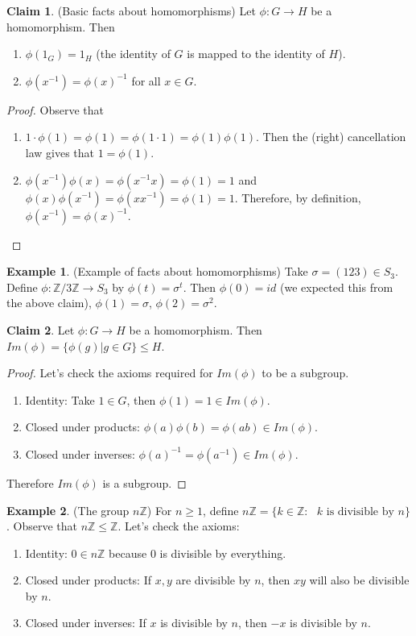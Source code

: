 \documentclass[12pt]{article}
\theoremstyle{definition}
\newtheorem{claim}{\color{JungleGreen}Claim}
\newtheorem{example}{\color{WildStrawberry}Example}
\theoremstyle{definition}
\begin{document}
\begin{claim}(Basic facts about homomorphisms)
Let $\phi : G \to H$ be a homomorphism. Then
\begin{enumerate}
	\item $\phi(1_G) = 1_H$ (the identity of $G$ is mapped to the identity of $H$).
	\item $\phi(x^{-1}) = \phi(x)^{-1}$ for all $x \in G$.
\end{enumerate}
\end{claim}
\begin{proof}
Observe that
\begin{enumerate}
	\item $1 \cdot \phi(1) = \phi(1) = \phi(1 \cdot 1) = \phi(1)\phi(1)$. Then the (right) cancellation law gives that $1 = \phi(1)$.
	\item $\phi(x^{-1})\phi(x) = \phi(x^{-1}x) = \phi(1) = 1$ and $\phi(x)\phi(x^{-1}) = \phi(xx^{-1}) = \phi(1) = 1$. Therefore, by definition, $\phi(x^{-1}) = \phi(x)^{-1}$.
\end{enumerate}
\end{proof}

\begin{example}(Example of facts about homomorphisms)
Take $\sigma = (1 2 3) \in S_3$. Define $\phi : \mathbb{Z} / 3 \mathbb{Z} \to S_3$ by $\phi(t) = \sigma^t$. Then $\phi(0) = id$ (we expected this from the above claim), $\phi(1) = \sigma$, $\phi(2) = \sigma^2$. 
\end{example}

\begin{claim}
Let $\phi : G \to H$ be a homomorphism. Then $Im(\phi) = \{ \phi(g) | g \in G \} \leq H$.
\end{claim}
\begin{proof}
Let's check the axioms required for $Im(\phi)$ to be a subgroup.
\begin{enumerate}
	\item Identity: Take $1 \in G$, then $\phi(1) = 1 \in Im(\phi)$.
	\item Closed under products: $\phi(a)\phi(b) = \phi(ab) \in Im(\phi)$.
	\item Closed under inverses: $\phi(a)^{-1} = \phi(a^{-1}) \in Im(\phi)$.
\end{enumerate}
Therefore $Im(\phi)$ is a subgroup.
\end{proof}

\begin{example}(The group $n \mathbb{Z}$)
For $n \geq 1$, define $n \mathbb{Z} = \{ k \in \mathbb{Z} : \text{ $k$ is divisible by $n$} \}$. Observe that $n \mathbb{Z} \leq \mathbb{Z}$. Let's check the axioms:
\begin{enumerate}
	\item Identity: $0 \in n \mathbb{Z}$ because $0$ is divisible by everything. 
	\item Closed under products: If $x,y$ are divisible by $n$, then $xy$ will also be divisible by $n$.
	\item Closed under inverses: If $x$ is divisible by $n$, then $-x$ is divisible by $n$.
\end{enumerate}
\end{example}
\end{document}
